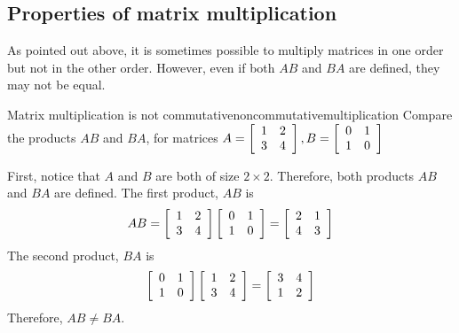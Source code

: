 \subsection{Properties of matrix multiplication}

As pointed out above, it is sometimes possible
to multiply matrices in one order
but not in the other order. However, even if both $AB$ and $BA$ are defined,
they may not be equal. 

\begin{example}{Matrix multiplication is not commutative}{noncommutativemultiplication}
Compare the products $AB$ and $BA$, for matrices $ A = \left[
\begin{array}{rr}
1 & 2 \\
3 & 4
\end{array}
\right], B= \left[
\begin{array}{rr}
0 & 1 \\
1 & 0
\end{array}
\right] $ 
\end{example}

\begin{solution} 
First, notice that $A$ and $B$ are both of size $2 \times 2$. Therefore, both 
products $AB$ and $BA$ are defined. 
The first product, $AB$ is
\begin{equation*}
AB = \left[
\begin{array}{rr}
1 & 2 \\
3 & 4
\end{array}
\right] \left[
\begin{array}{rr}
0 & 1 \\
1 & 0
\end{array}
\right] = \left[
\begin{array}{rr}
2 & 1 \\
4 & 3
\end{array}
\right] 
\end{equation*}
The second product, $BA$ is
\begin{equation*}
\left[
\begin{array}{rr}
0 & 1 \\
1 & 0
\end{array}
\right] \left[
\begin{array}{rr}
1 & 2 \\
3 & 4
\end{array}
\right] = \left[
\begin{array}{rr}
3 & 4 \\
1 & 2
\end{array}
\right] 
\end{equation*}
Therefore, $AB \neq BA$. 
\end{solution}

